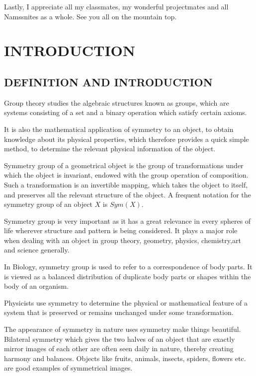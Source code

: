 \documentclass[a4paper, 12pt, openany]{report}
\begin{document}
 Lastly, I appreciate all my classmates, my wonderful projectmates and all Namssnites as a whole. See you all on the mountain top. 
\clearpage
 \tableofcontents
	\clearpage
		\chapter{INTRODUCTION}
	\section{DEFINITION AND INTRODUCTION}
	Group theory studies the algebraic structures known as groups, which are systems consisting of a set and a binary operation which satisfy certain \break axioms.
	
It is also the mathematical application of symmetry to an object, to obtain knowledge about its physical properties, which therefore provides a quick simple method, to determine the relevant physical information of the object.
	
 Symmetry group of a geometrical object is the group of transformations under which the object is invariant, endowed with the group operation of composition. Such a transformation is an invertible mapping, which takes the object to itself, and preserves all the relevant structure of the object. A frequent notation for the symmetry group of an object  $X$ is $Sym(X)$.
	
	Symmetry group is very important as it has a great relevance in every spheres of life wherever structure and pattern is being considered. It plays a major role when dealing with an object in group theory, geometry, physics, chemistry,art and science  generally.
	
	In Biology, symmetry group is used to refer to a correspondence of body parts. It is viewed as a balanced distribution of duplicate body parts or shapes within the body of an organism.
	
  Physicists use symmetry to determine the physical or mathematical \break feature of a system that is preserved or remains unchanged under some \break transformation. 
	
	The appearance of symmetry in nature uses symmetry  make things \break beautiful. Bilateral symmetry which gives the two halves of an object that are exactly mirror images of each other are often seen daily in nature, thereby creating harmony and balances. Objects like fruits, animals, insects, spiders, flowers etc. are good examples of symmetrical images. 
		
\end{document}
